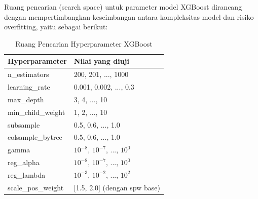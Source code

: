 Ruang pencarian (search space) untuk parameter model XGBoost dirancang dengan mempertimbangkan keseimbangan antara kompleksitas model dan risiko overfitting, yaitu sebagai berikut:


\begin{table}[H]
    \centering
    \caption{Ruang Pencarian Hyperparameter XGBoost}
    \label{tab:search_space_xgboost}
    \begin{tabular}{|l|l|}
        \hline
        \textbf{Hyperparameter} & \textbf{Nilai yang diuji} \\ \hline
        n\_estimators & 200, 201, ..., 1000 \\ \hline
        learning\_rate & 0.001, 0.002, ..., 0.3 \\ \hline
        max\_depth & 3, 4, ..., 10 \\ \hline
        min\_child\_weight & 1, 2, ..., 10 \\ \hline
        subsample & 0.5, 0.6, ..., 1.0 \\ \hline
        colsample\_bytree & 0.5, 0.6, ..., 1.0 \\ \hline
        gamma & $10^{-8}$, $10^{-7}$, ..., $10^{0}$ \\ \hline
        reg\_alpha & $10^{-8}$, $10^{-7}$, ..., $10^{0}$ \\ \hline
        reg\_lambda & $10^{-3}$, $10^{-2}$, ..., $10^{2}$ \\ \hline
        scale\_pos\_weight & [1.5, 2.0] (dengan spw base) \\ \hline
    \end{tabular}
\end{table}

